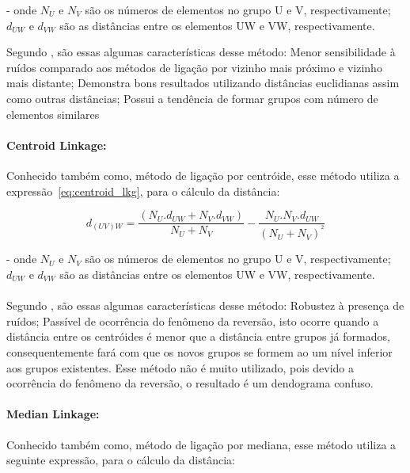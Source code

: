 - onde $N_{U}$ e $N_{V}$ são os números de elementos no grupo U e V, respectivamente; $d_{UW}$ e $d_{VW}$ são as distâncias entre os elementos UW e VW, respectivamente.  

Segundo \cite{kaufman1990finding}, são essas algumas características desse método: Menor sensibilidade à ruídos comparado aos métodos de ligação por vizinho mais próximo e vizinho mais distante; Demonstra bons resultados utilizando distâncias euclidianas assim como outras distâncias; Possui a tendência de formar grupos com número de elementos similares

\paragraph{Centroid Linkage:}

Conhecido também como, método de ligação por centróide, esse método utiliza a expressão~\ref{eq:centroid_lkg}, para o cálculo da distância:

\begin{equation}\label{eq:centroid_lkg}
d_{(UV)W} = \frac{(N_{U}.d_{UW} + N_{V}.d_{VW})}{N_{U}+N_{V}} - \frac{N_{U}.N_{V}.d_{UW}}{(N_{U} + N_{V})^{^{2}}}
\end{equation}

- onde $N_{U}$ e $N_{V}$ são os números de elementos no grupo U e V, respectivamente; $d_{UW}$ e $d_{VW}$ são as distâncias entre os elementos UW e VW, respectivamente. 

\paragraph{}
Segundo \cite{Doni:2004}, são essas algumas características desse método: Robustez à presença de ruídos; Passível de ocorrência do fenômeno da reversão, isto ocorre quando a distância entre os centróides é menor que a distância entre grupos já formados, consequentemente fará com que os novos grupos se formem ao um nível inferior aos grupos existentes. Esse método não é muito utilizado, pois devido a ocorrência do fenômeno da reversão, o resultado é um dendograma confuso.

\paragraph{Median Linkage:}

Conhecido também como, método de ligação por mediana, esse método utiliza a seguinte expressão, para o cálculo da distância:

